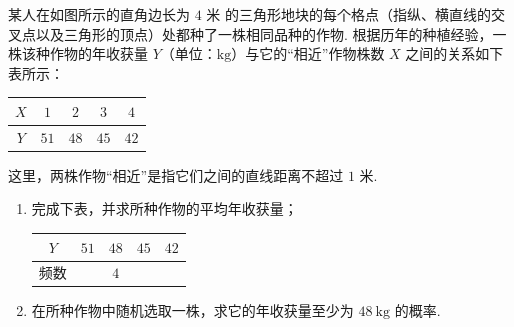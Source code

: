 \begin{problem}
某人在如图所示的直角边长为 \(4\text{ 米}\) 的三角形地块的每个格点（指纵、横直线的交叉点以及三角形的顶点）处都种了一株相同品种的作物. 根据历年的种植经验，一株该种作物的年收获量 \(Y\)（单位：\(\mathrm{kg}\)）与它的“相近”作物株数 \(X\) 之间的关系如下表所示：
\begin{center}
\begin{tabular}{c|cccc}
\(X\) & \(1\) & \(2\) & \(3\) & \(4\) \\
\hline
\(Y\) & \(51\) & \(48\) & \(45\) & \(42\)
\end{tabular}
\end{center}
这里，两株作物“相近”是指它们之间的直线距离不超过 \(1\text{ 米}\).

\begin{enumerate}
\item 完成下表，并求所种作物的平均年收获量；
\begin{center}
\begin{tabular}{c|cccc}
\(Y\) & \(51\) & \(48\) & \(45\) & \(42\) \\
\hline
频数 &\fillinblank{} & \(4\) &\fillinblank{} &\fillinblank{}
\end{tabular}
\end{center}
\item 在所种作物中随机选取一株，求它的年收获量至少为 \(48 \mathrm{~kg}\) 的概率.
\end{enumerate}

\end{problem}

